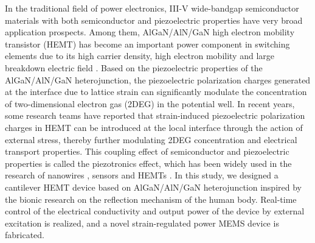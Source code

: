 In  the traditional field of power electronics, III-V wide-bandgap semiconductor materials with both semiconductor and piezoelectric properties  have very broad application prospects. Among them, AlGaN/AlN/GaN high electron mobility transistor (HEMT)  has become an important power component in switching elements due to its high carrier density, high electron mobility  and large breakdown  electric field \cite{shen2001algan,zhang2000high}. Based on the piezoelectric properties of the  AlGaN/AlN/GaN heterojunction, the piezoelectric polarization charges  generated at the interface  due to lattice strain  can significantly modulate the concentration of two-dimensional electron gas (2DEG) in the  potential well. In recent years, some research teams have reported that strain-induced piezoelectric polarization charges in HEMT can be introduced at the local interface through the action of external stress, thereby further modulating 2DEG concentration  and electrical transport properties. This coupling effect of semiconductor and piezoelectric properties is called the piezotronics  effect, which has been widely used in the research of nanowires \cite{zhao2015piezotronic}, sensors \cite{hua2020flexible} and HEMTs \cite{liu2017electrical}. In this study, we designed a cantilever  HEMT device based on AlGaN/AlN/GaN heterojunction  inspired by the bionic  research on the reflection mechanism of the human body. Real-time control of the electrical conductivity  and output power  of the device by external excitation is realized, and a novel strain-regulated power MEMS device is fabricated.

